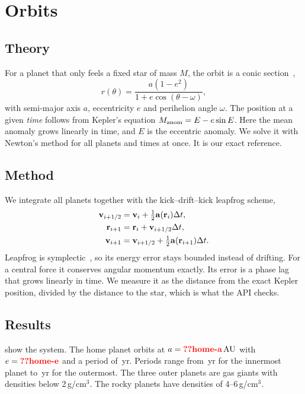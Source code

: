 \documentclass[aps,prd,twocolumn,nofootinbib,floatfix,superscriptaddress]{revtex4-2}
\begin{document}
\section{Orbits}\label{sec:orbits}
\subsection{Theory}
For a planet that only feels a fixed star of mass $M$, the orbit is a conic section~\cite{ast2000notes},
\begin{equation}
  r(\theta)=\frac{a(1-e^2)}{1+e\cos(\theta-\omega)}, \label{eq:ellipse}
\end{equation}
with semi-major axis $a$, eccentricity $e$ and perihelion angle $\omega$.
The position at a given \emph{time} follows from Kepler's equation $M_{\rm anom}=E-e\sin E$.
Here the mean anomaly grows linearly in time, and $E$ is the eccentric anomaly.
We solve it with Newton's method for all planets and times at once.
It is our exact reference.

\subsection{Method}
We integrate all planets together with the kick--drift--kick leapfrog scheme,
\begin{align}
  \mathbf{v}_{i+1/2} &= \mathbf{v}_i + \tfrac12\mathbf{a}(\mathbf{r}_i)\Delta t,\nonumber\\
  \mathbf{r}_{i+1}   &= \mathbf{r}_i + \mathbf{v}_{i+1/2}\Delta t,\\
  \mathbf{v}_{i+1}   &= \mathbf{v}_{i+1/2} + \tfrac12\mathbf{a}(\mathbf{r}_{i+1})\Delta t.\nonumber
\end{align}
Leapfrog is symplectic~\cite{hairer2006}, so its energy error stays bounded instead of drifting.
For a central force it conserves angular momentum exactly.
Its error is a phase lag that grows linearly in time.
We measure it as the distance from the exact Kepler position, divided by the distance to the star, which is what the API checks.

\subsection{Results}
 show the system.
The home planet orbits at $a=\val{home-a}\AU$ with $e=\val{home-e}$ and a period of \,yr.
Periods range from \,yr for the innermost planet to \,yr for the outermost.
The three outer planets are gas giants with densities below 2\,g/cm$^3$.
The rocky planets have densities of 4--6\,g/cm$^3$.
\end{document}
